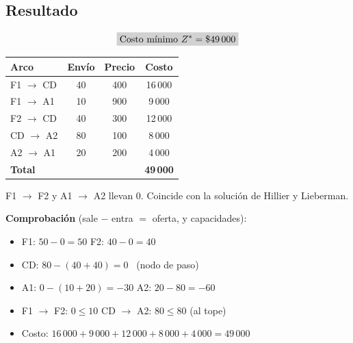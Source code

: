 \documentclass[11pt,a4paper]{article}
\newcommand{\ra}{\ensuremath{\to}}
\begin{document}
\subsection*{Resultado}
\[
\res{\text{Costo mínimo } Z^* = \$49\,000}
\]
\noindent
\begin{minipage}[c]{0.42\textwidth}\small\centering
\begin{tabular}{lccc}
\toprule
\textbf{Arco} & \textbf{Envío} & \textbf{Precio} & \textbf{Costo} \\
\midrule
F1 \ra{} CD & 40 & 400 & 16\,000 \\
F1 \ra{} A1 & 10 & 900 & 9\,000 \\
F2 \ra{} CD & 40 & 300 & 12\,000 \\
CD \ra{} A2 & 80 & 100 & 8\,000 \\
A2 \ra{} A1 & 20 & 200 & 4\,000 \\
\midrule
\textbf{Total} & & & \textbf{49\,000} \\
\bottomrule
\end{tabular}
\end{minipage}\hfill
\begin{minipage}[c]{0.56\textwidth}\small
F1 \ra{} F2 y A1 \ra{} A2 llevan 0. Coincide con la solución de Hillier y Lieberman.

\textbf{Comprobación} (sale $-$ entra $=$ oferta, y capacidades):
\begin{itemize}[itemsep=1pt, leftmargin=*]
  \item F1: $50 - 0 = 50$ \checkmark \quad F2: $40 - 0 = 40$ \checkmark
  \item CD: $80 - (40 + 40) = 0$ \checkmark \ (nodo de paso)
  \item A1: $0 - (10 + 20) = -30$ \checkmark \quad A2: $20 - 80 = -60$ \checkmark
  \item F1 \ra{} F2: $0 \le 10$ \checkmark \quad CD \ra{} A2: $80 \le 80$ \checkmark (al tope)
  \item Costo: $16\,000 + 9\,000 + 12\,000 + 8\,000 + 4\,000 = 49\,000$ \checkmark
\end{itemize}
\end{minipage}
\end{document}
